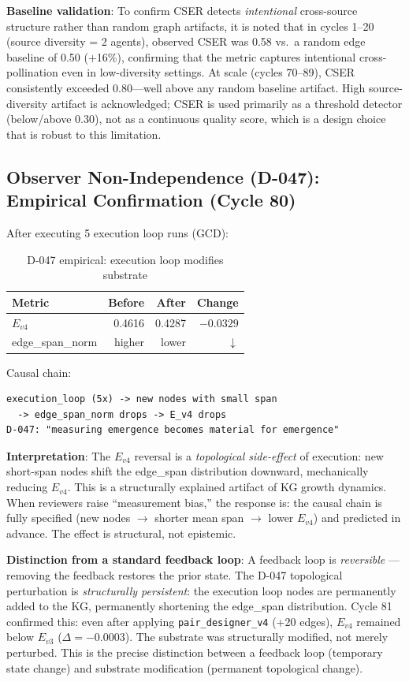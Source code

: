 \documentclass[12pt]{article}
\begin{document}
\noindent\textbf{Baseline validation}: To confirm CSER detects \emph{intentional} cross-source
structure rather than random graph artifacts, it is noted that in cycles 1--20 (source diversity
= 2 agents), observed CSER was 0.58 vs.\ a random edge baseline of 0.50 ($+$16\%), confirming
that the metric captures intentional cross-pollination even in low-diversity settings.
At scale (cycles 70--89), CSER consistently exceeded 0.80---well above any random baseline
artifact. High source-diversity artifact is acknowledged; CSER is used primarily as a
threshold detector (below/above 0.30), not as a continuous quality score, which is a
design choice that is robust to this limitation.

\subsection{Observer Non-Independence (D-047): Empirical Confirmation (Cycle 80)}

After executing 5 execution loop runs (GCD):

\begin{table}[h!]\centering\small
\begin{tabular}{lrrr}
\toprule
Metric & Before & After & Change \\
\midrule
$E_{v4}$ & 0.4616 & 0.4287 & $-0.0329$ \\
edge\_span\_norm & higher & lower & $\downarrow$ \\
\bottomrule
\end{tabular}
\caption{D-047 empirical: execution loop modifies substrate}
\end{table}

Causal chain:
\begin{lstlisting}
execution_loop (5x) -> new nodes with small span
  -> edge_span_norm drops -> E_v4 drops
D-047: "measuring emergence becomes material for emergence"
\end{lstlisting}

\noindent\textbf{Interpretation}: The $E_{v4}$ reversal is a \emph{topological side-effect} of execution: new short-span nodes shift the edge\_span distribution downward, mechanically reducing $E_{v4}$. This is a structurally explained artifact of KG growth dynamics. When reviewers raise ``measurement bias,'' the response is: the causal chain is fully specified (new nodes $\to$ shorter mean span $\to$ lower $E_{v4}$) and predicted in advance. The effect is structural, not epistemic.

\noindent\textbf{Distinction from a standard feedback loop}: A feedback loop is
\emph{reversible} --- removing the feedback restores the prior state.
The D-047 topological perturbation is \emph{structurally persistent}: the execution loop nodes are permanently
added to the KG, permanently shortening the edge\_span distribution.
Cycle 81 confirmed this: even after applying \texttt{pair\_designer\_v4} (+20 edges),
$E_{v4}$ remained below $E_{v3}$ ($\Delta = -0.0003$). The substrate was structurally
modified, not merely perturbed. This is the precise distinction between a feedback
loop (temporary state change) and substrate modification (permanent topological change).
\end{document}

